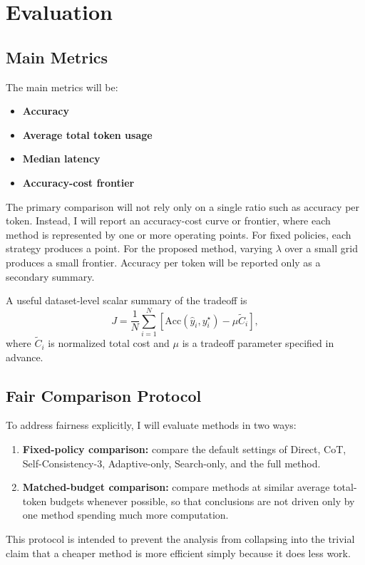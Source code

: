 \documentclass[10pt]{article}
\begin{document}
\section{Evaluation}
\subsection{Main Metrics}
The main metrics will be:
\begin{itemize}[leftmargin=1.2em,itemsep=0.08em]
    \item \textbf{Accuracy}
    \item \textbf{Average total token usage}
    \item \textbf{Median latency}
    \item \textbf{Accuracy-cost frontier}
\end{itemize}

The primary comparison will not rely only on a single ratio such as accuracy per token. Instead, I will report an accuracy-cost curve or frontier, where each method is represented by one or more operating points. For fixed policies, each strategy produces a point. For the proposed method, varying $\lambda$ over a small grid produces a small frontier. Accuracy per token will be reported only as a secondary summary.

A useful dataset-level scalar summary of the tradeoff is
\[
J=
\frac{1}{N}\sum_{i=1}^{N}
\left[
\mathrm{Acc}(\hat{y}_i,y_i^\star)-\mu\widetilde{C}_i
\right],
\]
where $\widetilde{C}_i$ is normalized total cost and $\mu$ is a tradeoff parameter specified in advance.

\subsection{Fair Comparison Protocol}
To address fairness explicitly, I will evaluate methods in two ways:
\begin{enumerate}[leftmargin=1.3em,itemsep=0.10em]
    \item \textbf{Fixed-policy comparison:} compare the default settings of Direct, CoT, Self-Consistency-3, Adaptive-only, Search-only, and the full method.
    \item \textbf{Matched-budget comparison:} compare methods at similar average total-token budgets whenever possible, so that conclusions are not driven only by one method spending much more computation.
\end{enumerate}
This protocol is intended to prevent the analysis from collapsing into the trivial claim that a cheaper method is more efficient simply because it does less work.
\end{document}
